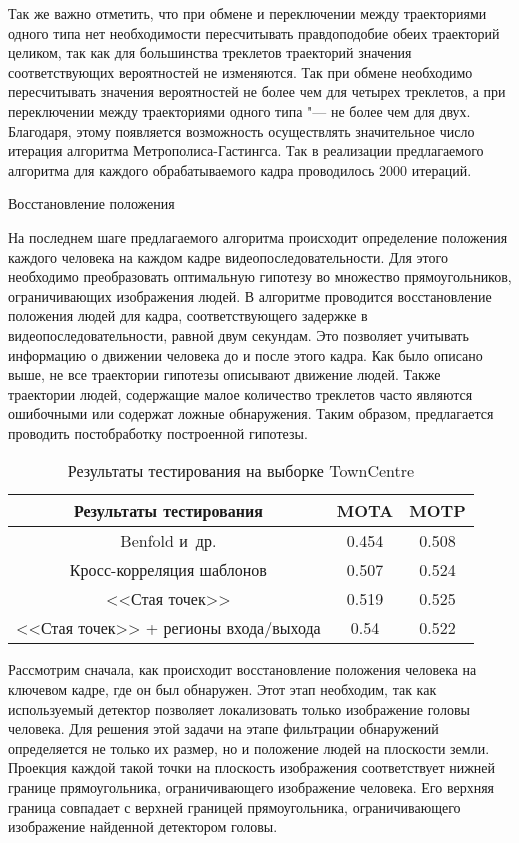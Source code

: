 Так же важно отметить, что при обмене и переключении между траекториями одного типа нет необходимости пересчитывать правдоподобие обеих траекторий целиком, так как для большинства треклетов траекторий значения соответствующих вероятностей не изменяются. Так при обмене необходимо пересчитывать значения вероятностей не более чем для четырех треклетов, а при переключении между траекториями одного типа "--- не более чем для двух. Благодаря, этому появляется возможность осуществлять значительное число итерация алгоритма Метрополиса-Гастингса. Так в реализации предлагаемого алгоритма для каждого обрабатываемого кадра проводилось 2000 итераций.

Восстановление положения

На последнем шаге предлагаемого алгоритма происходит определение положения каждого человека на каждом кадре видеопоследовательности. Для этого необходимо преобразовать оптимальную гипотезу во множество прямоугольников, ограничивающих изображения людей. В алгоритме проводится восстановление положения людей для кадра, соответствующего задержке в видеопоследовательности, равной двум секундам. Это позволяет учитывать информацию о движении человека до и после этого кадра. Как было описано выше, не все траектории гипотезы описывают движение людей. Также траектории людей, содержащие малое количество треклетов часто являются ошибочными или содержат ложные обнаружения. Таким образом, предлагается проводить постобработку построенной гипотезы.

\begin{table}[h]
	\caption{Результаты тестирования на выборке TownCentre}\label{sec::tracking:tab::comparison} \centering
	\begin{tabular}{|c|c|c|}
		\hline
		Результаты тестирования & MOTA & MOTP\\
		\hline \hline
		Benfold и~др. \cite{benfold2011stable} & 0.454 & 0.508 \\ \hline
		Кросс-корреляция шаблонов & 0.507 & 0.524 \\ \hline
		<<Стая точек>> & 0.519 & 0.525 \\ \hline
		<<Стая точек>> + регионы входа/выхода & 0.54 & 0.522 \\ \hline
	\end{tabular}
\end{table}

Рассмотрим сначала, как происходит восстановление положения человека на ключевом кадре, где он был обнаружен. Этот этап необходим, так как используемый детектор позволяет локализовать только изображение головы человека. Для решения этой задачи на этапе фильтрации обнаружений определяется не только их размер, но и положение людей на плоскости земли. Проекция каждой такой точки на плоскость изображения соответствует нижней границе прямоугольника, ограничивающего изображение человека. Его верхняя граница совпадает с верхней границей прямоугольника, ограничивающего изображение найденной детектором головы.

